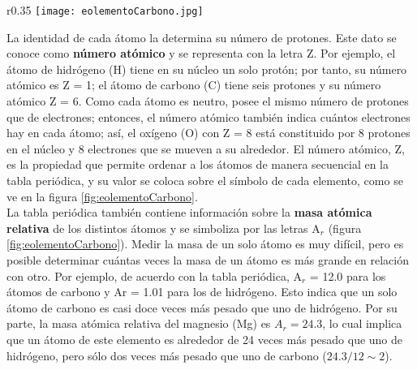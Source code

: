 \begin{wrapfigure}{r}{0.35\textwidth}
    \centering
    \texttt{[image: eolementoCarbono.jpg]}
    \label{fig:eolementoCarbono}
\end{wrapfigure}%

La identidad de cada átomo la determina su número de protones. Este dato se conoce como \textbf{número atómico} y
se representa con la letra Z. Por ejemplo, el átomo de hidrógeno (H) tiene en su núcleo un solo protón;
por tanto, su número atómico es Z = 1; el átomo de carbono (C) tiene seis protones y su número atómico
Z = 6. Como cada átomo es neutro, posee el mismo número de protones que de electrones; entonces, el número
atómico también indica cuántos electrones hay en cada átomo; así, el oxígeno (O) con Z = 8 está constituido
por 8 protones en el núcleo y 8 electrones que se mueven a su alrededor. El número atómico, Z, es la propiedad
que permite ordenar a los átomos de manera secuencial en la tabla periódica, y su valor se coloca sobre el símbolo
de cada elemento, como se ve en la figura \ref{fig:eolementoCarbono}.\\

La tabla periódica también contiene información sobre la \textbf{masa atómica relativa} de los distintos átomos y se
simboliza por las letras A$_r$ (figura \ref{fig:eolementoCarbono}). Medir la masa de un solo átomo es muy difícil,
pero es posible determinar cuántas veces la masa de un átomo es más grande en relación con otro.
Por ejemplo, de acuerdo con la tabla periódica,
A$_r$ = 12.0 para los átomos de carbono y Ar = 1.01 para los de hidrógeno. Esto indica que un solo átomo de carbono
es casi doce veces más pesado que uno de hidrógeno. Por su parte, la masa atómica relativa del magnesio (Mg)
es $A_r = 24.3$, lo cual implica que un átomo de este elemento es alrededor de 24 veces más pesado que uno de
hidrógeno, pero sólo dos veces más pesado que uno de carbono ($24.3/12 \sim 2$).\\

